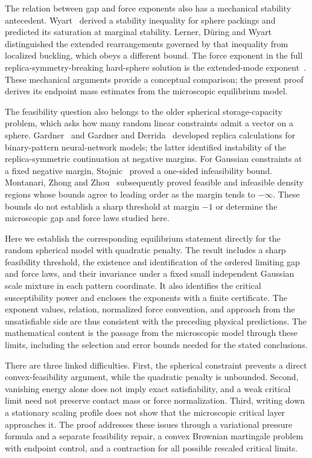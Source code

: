 \documentclass[11pt,a4paper]{article}
\numberwithin{equation}{section}
\theoremstyle{definition}
\theoremstyle{remark}
\begin{document}
The relation between gap and force exponents also has a mechanical
stability antecedent. Wyart~\cite{Wyart2012} derived a stability inequality
for sphere packings and predicted its saturation at marginal stability.
Lerner, D\"uring and Wyart~\cite{LernerDuringWyart2013} distinguished the
extended rearrangements governed by that inequality from localized
buckling, which obeys a different bound. The force exponent in the
full replica-symmetry-breaking hard-sphere solution is the extended-mode
exponent~\cite{CKPUZ2014}. These mechanical arguments provide a conceptual
comparison; the present proof derives its endpoint mass estimates from
the microscopic equilibrium model.

The feasibility question also belongs to the older spherical
storage-capacity problem, which asks how many random linear constraints
admit a vector on a sphere.  Gardner~\cite{Gardner1988} and Gardner and
Derrida~\cite{GardnerDerrida1988} developed replica calculations for
binary-pattern neural-network models; the latter identified instability
of the replica-symmetric continuation at negative margins.  For Gaussian
constraints at a fixed negative margin, Stojnic~\cite[Section 2.3]{Stojnic2013}
proved a one-sided infeasibility bound.  Montanari, Zhong and
Zhou~\cite[Theorems 4.1--4.2]{MontanariZhongZhou2024} subsequently proved
feasible and infeasible density regions whose bounds agree to leading
order as the margin tends to $-\infty$.  These bounds do not establish a
sharp threshold at margin $-1$ or determine the microscopic gap and force
laws studied here.

Here we establish the corresponding equilibrium statement directly for
the random spherical model with quadratic penalty.  The result includes
a sharp feasibility threshold, the existence and identification of the
ordered limiting gap and force laws, and their invariance under a fixed
small independent Gaussian scale mixture in each pattern coordinate.
It also identifies the critical susceptibility power and encloses the exponents
with a finite certificate.  The exponent values, relation, normalized
force convention, and approach from the unsatisfiable side are thus
consistent with the preceding physical predictions.  The mathematical
content is the passage from the microscopic model through these limits,
including the selection and error bounds needed for the stated
conclusions.

There are three linked difficulties.  First, the spherical constraint
prevents a direct convex-feasibility argument, while the quadratic penalty
is unbounded.  Second, vanishing energy alone does not imply exact
satisfiability, and a weak critical limit need not preserve contact mass
or force normalization.  Third, writing down a stationary scaling profile
does not show that the microscopic critical layer approaches it.  The
proof addresses these issues through a variational pressure formula and
a separate feasibility repair, a convex Brownian martingale problem
with endpoint control, and a contraction for all possible rescaled
critical limits.
\end{document}
